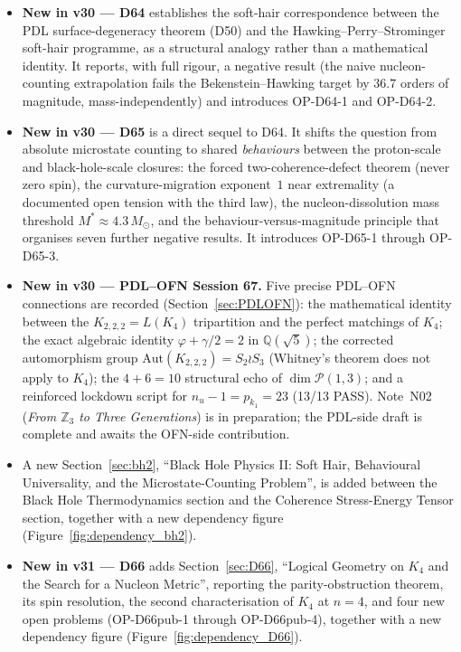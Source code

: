 \documentclass[11pt,a4paper]{article}
\theoremstyle{plain}
\theoremstyle{definition}
\theoremstyle{remark}
\begin{document}
\begin{itemize}
\item \textbf{New in v30 --- D64} establishes the soft-hair correspondence between the PDL surface-degeneracy theorem (D50) and the Hawking--Perry--Strominger soft-hair programme, as a structural analogy rather than a mathematical identity. It reports, with full rigour, a negative result (the naive nucleon-counting extrapolation fails the Bekenstein--Hawking target by $36.7$ orders of magnitude, mass-independently) and introduces OP-D64-1 and OP-D64-2.
\item \textbf{New in v30 --- D65} is a direct sequel to D64. It shifts the question from absolute microstate counting to shared \emph{behaviours} between the proton-scale and black-hole-scale closures: the forced two-coherence-defect theorem (never zero spin), the curvature-migration exponent~$1$ near extremality (a documented open tension with the third law), the nucleon-dissolution mass threshold $M^*\approx4.3\,M_\odot$, and the behaviour-versus-magnitude principle that organises seven further negative results. It introduces OP-D65-1 through OP-D65-3.
\item \textbf{New in v30 --- PDL--OFN Session 67.} Five precise PDL--OFN connections are recorded (Section~\ref{sec:PDLOFN}): the mathematical identity between the $K_{2,2,2}=L(K_4)$ tripartition and the perfect matchings of $K_4$; the exact algebraic identity $\varphi+\gamma/2=2$ in $\mathbb{Q}(\sqrt{5})$; the corrected automorphism group $\mathrm{Aut}(K_{2,2,2})=S_2\wr S_3$ (Whitney's theorem does not apply to $K_4$); the $4+6=10$ structural echo of $\dim\mathcal{P}(1,3)$; and a reinforced lockdown script for $n_u-1=p_{k_1}=23$ (13/13 PASS). Note~N02 (\emph{From $\mathbb{Z}_3$ to Three Generations}) is in preparation; the PDL-side draft is complete and awaits the OFN-side contribution.
\item A new Section~\ref{sec:bh2}, ``Black Hole Physics II: Soft Hair, Behavioural Universality, and the Microstate-Counting Problem'', is added between the Black Hole Thermodynamics section and the Coherence Stress-Energy Tensor section, together with a new dependency figure (Figure~\ref{fig:dependency_bh2}).
\item \textbf{New in v31 --- D66} adds Section~\ref{sec:D66}, ``Logical Geometry on $K_4$ and the Search for a Nucleon Metric'', reporting the parity-obstruction theorem, its spin resolution, the second characterisation of $K_4$ at $n=4$, and four new open problems (OP-D66pub-1 through OP-D66pub-4), together with a new dependency figure (Figure~\ref{fig:dependency_D66}).

\end{itemize}
\end{document}
